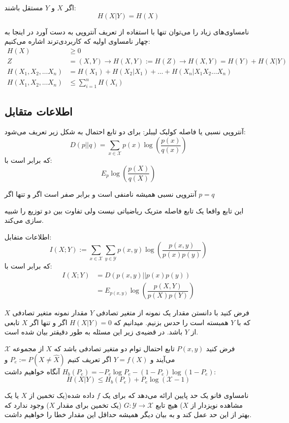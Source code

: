 \begin{theorem}
اگر
$X$
و
$Y$
مستقل باشند:
$$H(X|Y) = H(X)$$
\end{theorem}
\begin{theorem}
	نامساوی‌های زیاد را می‌توان تنها با استفاده از تعریف آنتروپی به دست آورد در اینجا به چهار نامساوی اولیه که کاربردی‌ترند اشاره می‌کنیم:
	\begin{align*}
H(X) &\geq 0 \\
Z &= (X, Y) \rightarrow H(X, Y) := H(Z) \rightarrow H(X, Y) = H(Y) + H(X|Y) \\
H(X_1, X_2, \dots X_n) &= H(X_1) + H(X_2 | X_1) + \dots + H(X_n | X_1 X_2 \dots X_n)\\
H(X_1, X_2, \dots X_n) &\leq \sum_{i = 1}^{n} H(X_i)
\end{align*}
\end{theorem}
\subsection{اطلاعات متقابل}
\begin{definition}
آنتروپی نسبی یا فاصله کولبک لیبلر: برای دو تابع احتمال به شکل زیر تعریف می‌شود:
$$
D(p||q) = \sum_{x \in \mathcal{X}} p(x) \log(\dfrac{p(x)}{q(x)})
$$
که برابر است با:
$$E_p \log(\dfrac{p(X)}{q(X)})$$
\end{definition}
\begin{theorem}
آنتروپی نسبی همیشه نامنفی است و برابر صفر است اگر و تنها اگر
$p = q$
\end{theorem}
این تابع واقعا یک تابع فاصله متریک ریاضیاتی نیست ولی تفاوت بین دو توزیع را شبیه سازی می‌کند.
\begin{definition}
اطلاعات متفابل:
$$I(X; Y) := \sum_{x \in \mathcal{X}} \sum_{y \in \mathcal{Y}} p(x, y) \log(\dfrac{p(x, y)}{p(x)p(y)})$$
که برابر است با:
\begin{align*}
    I(X;Y) &= D(p(x, y) || p(x)p(y))
    \\
    &= E_{p(x, y)} \log(\dfrac{p(X, Y)}{p(X)p(Y)})
\end{align*}
\end{definition}

فرض کنید با دانستن مقدار یک نمونه از متغیر تصادفی
$Y$
مقدار نمونه متغیر تصادفی
$X$
که با
$Y$
همبسته است را حدس بزنیم. میدانیم که
$H(X|Y) = 0$
اگر و تنها اگر
$X$
تابعی از
$Y$
باشد. در قضیه‌ی زیر این مسئله به طور دقیقتر بیان شده است.
\begin{theorem}
فرض کنید
$P(x, y)$
تابع احتمال توام دو متغیر تصادفی باشد که
$X$
از مجموعه
$\mathcal{X}$
می‌آیند و
$Y = f(X)$
اگر تعریف کنیم
$P_e := P(X \neq \hat{X})$
و
$H_b(P_e) = - P_e \log P_e - (1 - P_e) \log(1 - P_e)$
آنگاه خواهیم داشت:
$$H(X|Y) \leq H_b(P_e) + P_e \log(\mathcal{X} - 1)$$
\end{theorem}
\begin{remark}
نامساوی فانو یک حد پایین ارائه می‌دهد که برای یک
$f$
داده شده(یک تخمین از
$X$
یا یک مشاهده نویزدار از
$X$)
هیچ تابع
$G:\mathcal{Y} \rightarrow \mathcal{X}$
(یک تخمین برای مقدار
$X$)
وجود ندارد که بهتر از این حد عمل کند و به بیان دیگر همیشه حداقل این مقدار خطا را خواهیم داشت.
\end{remark}

